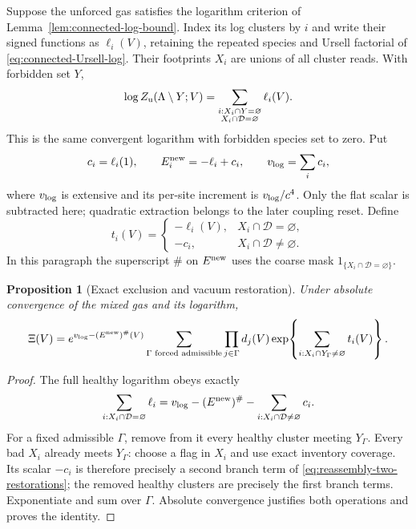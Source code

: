 \documentclass[11pt,reqno]{amsart}
\numberwithin{equation}{section}
\newtheorem{proposition}[theorem]{Proposition}
\theoremstyle{definition}
\theoremstyle{remark}
\begin{document}
Suppose the unforced gas satisfies the logarithm criterion of
Lemma~\ref{lem:connected-log-bound}. Index its log clusters by
\(i\) and write their signed functions as \(\ell_i(V)\), retaining
the repeated species and Ursell factorial of
\eqref{eq:connected-Ursell-log}. Their footprints \(X_i\) are
unions of all cluster reads. With forbidden set \(Y\),
\[
 \log Z_{\rm u}(\Lambda\setminus Y;V)
    =\sum_{\substack{i:X_i\cap Y=\varnothing\\
                       X_i\cap\mathcal D=\varnothing}}\ell_i(V).
\]
This is the same convergent logarithm with forbidden species set
to zero. Put
\[
 c_i=\ell_i(1),\qquad E_i^{\rm new}=-\ell_i+c_i,\qquad
 v_{\rm log}=\sum_i c_i,
\]
where \(v_{\rm log}\) is extensive and its per-site increment
is \(v_{\rm log}/c^4\). Only the flat scalar is subtracted here;
quadratic extraction belongs to the later coupling reset.
Define
\begin{equation}
 t_i(V)=\begin{cases}
          -\ell_i(V),&X_i\cap\mathcal D=\varnothing,\\
          -c_i,&X_i\cap\mathcal D\ne\varnothing.
        \end{cases}
 \label{eq:reassembly-two-restorations}
\end{equation}
In this paragraph the superscript \(\#\) on \(E^{\rm new}\)
uses the coarse mask \(1_{\{X_i\cap\mathcal D=\varnothing\}}\).

\begin{proposition}[Exact exclusion and vacuum restoration]
\label{prop:reassembly-exact-restoration}
Under absolute convergence of the mixed gas and its logarithm,
\begin{equation}
 \Xi(V)=e^{v_{\rm log}-(E^{\rm new})^\#(V)}
   \sum_{\Gamma\text{ forced admissible}}\prod_{j\in\Gamma}d_j(V)
            \exp\!\left\{\sum_{i:X_i\cap Y_\Gamma\ne\varnothing}t_i(V)\right\}.
 \label{eq:reassembly-exact-restoration}
\end{equation}
\end{proposition}
\begin{proof}
The full healthy logarithm obeys exactly
\[
 \sum_{i:X_i\cap\mathcal D=\varnothing}\ell_i
  =v_{\rm log}-(E^{\rm new})^\#
                               -\sum_{i:X_i\cap\mathcal D\ne\varnothing}c_i.
\]
For a fixed admissible \(\Gamma\), remove from it every healthy
cluster meeting \(Y_\Gamma\). Every bad \(X_i\) already meets
\(Y_\Gamma\): choose a flag in \(X_i\) and use exact inventory
coverage. Its scalar \(-c_i\) is therefore precisely a second
branch term of \eqref{eq:reassembly-two-restorations}; the removed
healthy clusters are precisely the first branch terms. Exponentiate
and sum over \(\Gamma\). Absolute convergence justifies both
operations and proves the identity.
\end{proof}
\end{document}
